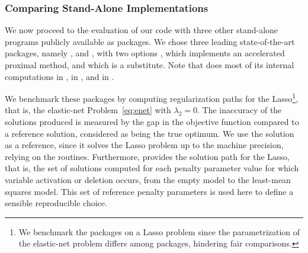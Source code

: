 \subsubsection{Comparing Stand-Alone Implementations}

We  now  proceed  to the  evaluation  of  our  code with  three  other
stand-alone programs publicly  available as  packages.  We
chose     three    leading    state-of-the-art     packages,    namely
  \citep[Generalized  Linear  Models  regularized  by
Lasso    and    elastic-net,][]{2009_JSS_Friedman},    
\citep[Least      Angle     Regression,     lasso      and     forward
Stagewise,][]{2004_AS_Efron}    and      \citep[SPArse
Modeling     Software,][]{2012_FML_Bach},     with     two     options
,  which   implements  an  accelerated  proximal
method,   and     which   is  a   
substitute.   Note that   does  most of  its internal
computations  in ,   in ,
and   in .   


We benchmark these packages by computing  regularization paths for the
Lasso\footnote{%
  We benchmark the packages on a Lasso problem since the parametrization of the
  elastic-net problem differs among packages, hindering fair comparisons.},
that is, the elastic-net Problem~\eqref{eq:enet} with $\lambda_2=0$.   
%
The inaccuracy of the solutions produced is measured by the gap in the objective
function compared to a reference solution, considered as being the true optimum.  
\iflong
  We use the  solution as a reference, since it solves the Lasso problem
  up to the machine precision, relying on the  routines. 
  Furthermore,  provides the solution path for the Lasso,
  that is, the set of solutions computed for each penalty parameter value
  for which variable activation or deletion occurs, from the empty model to the
  least-mean squares model.
  This set of reference penalty parameters is used here to define a sensible reproducible choice.

